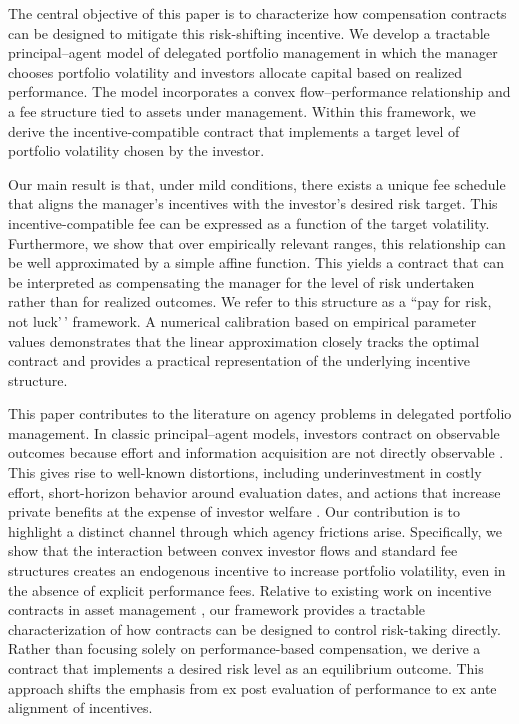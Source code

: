 The central objective of this paper is to characterize how compensation
contracts can be designed to mitigate this risk-shifting incentive. We
develop a tractable principal--agent model of delegated portfolio
management in which the manager chooses portfolio volatility and
investors allocate capital based on realized performance. The model
incorporates a convex flow--performance relationship and a fee structure
tied to assets under management. Within this framework, we derive the
incentive-compatible contract that implements a target level of
portfolio volatility chosen by the investor.

Our main result is that, under mild conditions, there exists a unique
fee schedule that aligns the manager's incentives with the investor's
desired risk target. This incentive-compatible fee can be expressed as a
function of the target volatility. Furthermore, we show that over
empirically relevant ranges, this relationship can be well approximated
by a simple affine function. This yields a contract that can be
interpreted as compensating the manager for the level of risk undertaken
rather than for realized outcomes. We refer to this structure as a ``pay
for risk, not luck'\,' framework. A numerical calibration based on
empirical parameter values demonstrates that the linear approximation
closely tracks the optimal contract and provides a practical
representation of the underlying incentive structure.

This paper contributes to the literature on agency problems in delegated
portfolio management. In classic principal--agent models, investors
contract on observable outcomes because effort and information
acquisition are not directly observable
\citep{Holmstrom1979, AdmatiPfleiderer1997}. This gives rise to
well-known distortions, including underinvestment in costly effort,
short-horizon behavior around evaluation dates, and actions that
increase private benefits at the expense of investor welfare
\citep{JensenMeckling1976, Musto1999, CarhartKanielMustoReed2002}. Our
contribution is to highlight a distinct channel through which agency
frictions arise. Specifically, we show that the interaction between
convex investor flows and standard fee structures creates an endogenous
incentive to increase portfolio volatility, even in the absence of
explicit performance fees. Relative to existing work on incentive
contracts in asset management
\citep{Starks1987, AdmatiPfleiderer1997, HolmstromMilgrom1987}, our
framework provides a tractable characterization of how contracts can be
designed to control risk-taking directly. Rather than focusing solely on
performance-based compensation, we derive a contract that implements a
desired risk level as an equilibrium outcome. This approach shifts the
emphasis from ex post evaluation of performance to ex ante alignment of
incentives.


